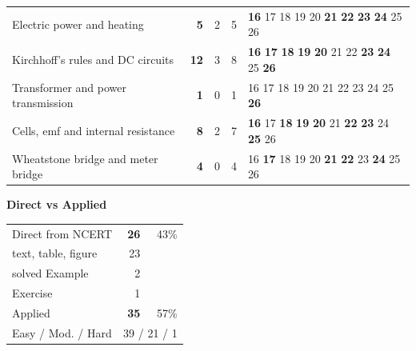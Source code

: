 {\begin{tabularx}{\linewidth}{@{}>{\raggedright\arraybackslash}Xrrrl@{}}
Electric power and heating & \textbf{5} & 2 & 5 & {\scriptsize \textbf{16} {\color{gray!45}17} {\color{gray!45}18} {\color{gray!45}19} {\color{gray!45}20} \textbf{21} \textbf{22} \textbf{23} \textbf{24} {\color{gray!45}25} {\color{gray!45}26}}\\
Kirchhoff's rules and DC circuits & \textbf{12} & 3 & 8 & {\scriptsize \textbf{16} \textbf{17} \textbf{18} \textbf{19} \textbf{20} {\color{gray!45}21} {\color{gray!45}22} \textbf{23} \textbf{24} {\color{gray!45}25} \textbf{26}}\\
Transformer and power transmission & \textbf{1} & 0 & 1 & {\scriptsize {\color{gray!45}16} {\color{gray!45}17} {\color{gray!45}18} {\color{gray!45}19} {\color{gray!45}20} {\color{gray!45}21} {\color{gray!45}22} {\color{gray!45}23} {\color{gray!45}24} {\color{gray!45}25} \textbf{26}}\\
Cells, emf and internal resistance & \textbf{8} & 2 & 7 & {\scriptsize \textbf{16} {\color{gray!45}17} \textbf{18} \textbf{19} \textbf{20} {\color{gray!45}21} \textbf{22} \textbf{23} {\color{gray!45}24} \textbf{25} {\color{gray!45}26}}\\
Wheatstone bridge and meter bridge & \textbf{4} & 0 & 4 & {\scriptsize {\color{gray!45}16} \textbf{17} {\color{gray!45}18} {\color{gray!45}19} {\color{gray!45}20} \textbf{21} \textbf{22} {\color{gray!45}23} \textbf{24} {\color{gray!45}25} {\color{gray!45}26}}\\
\bottomrule\end{tabularx}}\par\medskip
\begin{minipage}[t]{0.34\linewidth}{\small\textbf{\color{crimson}Direct vs Applied}\par\smallskip
\begin{tabular}{@{}lrr@{}}\toprule
Direct from NCERT & \textbf{26} & 43\%\\
\quad text, table, figure & 23 &\\
\quad solved Example & 2 &\\
\quad Exercise & 1 &\\
Applied & \textbf{35} & 57\%\\\midrule
Easy / Mod. / Hard & \multicolumn{2}{r}{39 / 21 / 1}\\\bottomrule
\end{tabular}}\end{minipage}\hfill
